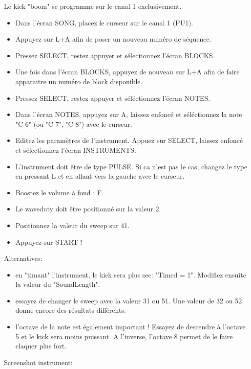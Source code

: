 \documentclass[12pt,a4paper]{article}
\begin{document}
    Le kick "boom" se programme sur le canal 1 exclusivement.    
    
    \begin{itemize}
    \item{Dans l'écran SONG, placez le curseur sur le canal 1 (PU1).}    
    \item{Appuyez sur L+A afin de poser un nouveau numéro de séquence.}
    \item{Pressez SELECT, restez appuyer et sélectionnez l'écran BLOCKS.}
    \item{Une fois dans l'écran BLOCKS, appuyez de nouveau sur L+A afin de faire apparaitre un numéro de block disponible.}
    \item{Pressez SELECT, restez appuyer et séléctionnez l'écran NOTES.}
    \item{Dans l'écran NOTES, appuyez sur A, laissez enfoncé et séléctionnez la note "C 6" (ou "C 7", "C 8") avec le curseur.}
    \item{Editez les paramètres de l'instrument. Appuez sur SELECT, laissez enfoncé et sélectionnez l'écran INSTRUMENTS.}
    \item{L'instrument doit être de type PULSE. Si ca n'est pas le cas, changez le type en pressant L et en allant vers la gauche avec le curseur.}
    \item{Boostez le volume à fond : F.}
    \item{Le waveduty doit être positionné sur la valeur 2.}
    \item{Positionnez la valeur du sweep sur 41.}
    \item{Appuyez sur START !}
    \end{itemize}\medskip
    
    Alternatives:
    \begin{itemize}
    \item{en "timant" l'instrument, le kick sera plus sec: "Timed = 1". Modifiez ensuite la valeur du "SoundLength".}
    \item{essayez de changer le sweep avec la valeur 31 ou 51. Une valeur de 32 ou 52 donne encore des résultats différents.}
    \item{l'octave de la note est également important ! Essayez de descendre à l'octave 5 et le kick sera moins puissant. A l'inverse, l'octave 8 permet de le faire claquer plus fort.}
    \end{itemize}\medskip
    
    Screenshot instrument:
	
\end{document}

